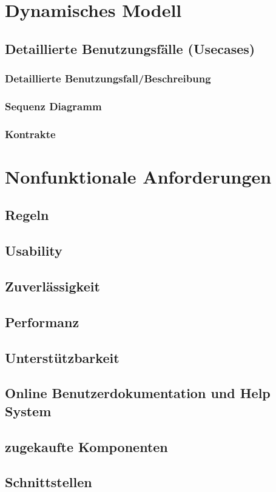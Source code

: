 \documentclass{article}
\begin{document}
\section{Dynamisches Modell}
\subsection{Detaillierte Benutzungsfälle (Usecases)}
\subsubsection{Detaillierte Benutzungsfall/Beschreibung}
\subsubsection{Sequenz Diagramm}
\subsubsection{Kontrakte}

\section{Nonfunktionale Anforderungen}
\subsection{Regeln}
\subsection{Usability}
\subsection{Zuverlässigkeit}
\subsection{Performanz}
\subsection{Unterstützbarkeit}
\subsection{Online Benutzerdokumentation und Help System}
\subsection{zugekaufte Komponenten}
\subsection{Schnittstellen}
\end{document}
